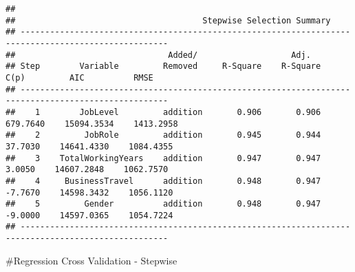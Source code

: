 \documentclass[]{article}
\begin{document}
\begin{verbatim}
## 
##                                      Stepwise Selection Summary                                      
## ----------------------------------------------------------------------------------------------------
##                               Added/                   Adj.                                             
## Step        Variable         Removed     R-Square    R-Square      C(p)         AIC          RMSE       
## ----------------------------------------------------------------------------------------------------
##    1        JobLevel         addition       0.906       0.906    679.7640    15094.3534    1413.2958    
##    2         JobRole         addition       0.945       0.944     37.7030    14641.4330    1084.4355    
##    3    TotalWorkingYears    addition       0.947       0.947      3.0050    14607.2848    1062.7570    
##    4     BusinessTravel      addition       0.948       0.947     -7.7670    14598.3432    1056.1120    
##    5         Gender          addition       0.948       0.947     -9.0000    14597.0365    1054.7224    
## ----------------------------------------------------------------------------------------------------
\end{verbatim}

\#Regression Cross Validation - Stepwise
\end{document}

